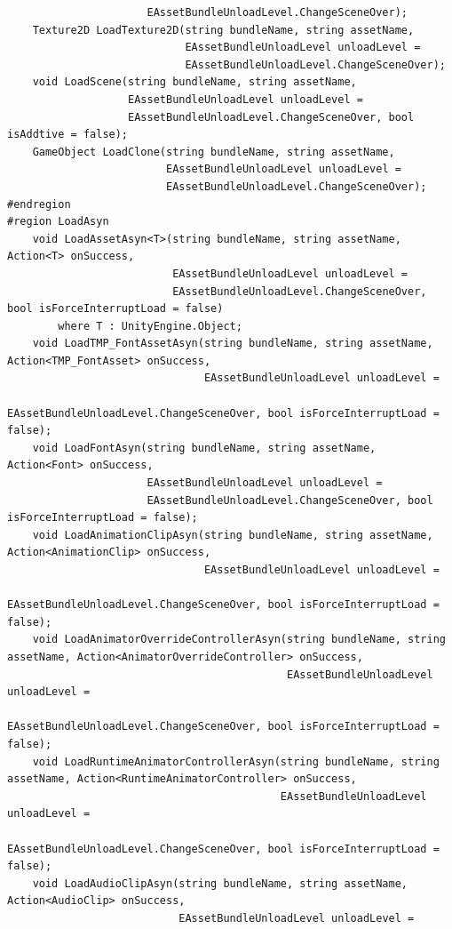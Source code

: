 \documentclass[9pt, b5paper]{article}
\begin{document}
\begin{verbatim}
                      EAssetBundleUnloadLevel.ChangeSceneOver);
    Texture2D LoadTexture2D(string bundleName, string assetName, 
                            EAssetBundleUnloadLevel unloadLevel = 
                            EAssetBundleUnloadLevel.ChangeSceneOver);
    void LoadScene(string bundleName, string assetName, 
                   EAssetBundleUnloadLevel unloadLevel = 
                   EAssetBundleUnloadLevel.ChangeSceneOver, bool isAddtive = false);
    GameObject LoadClone(string bundleName, string assetName, 
                         EAssetBundleUnloadLevel unloadLevel = 
                         EAssetBundleUnloadLevel.ChangeSceneOver);
#endregion
#region LoadAsyn
    void LoadAssetAsyn<T>(string bundleName, string assetName, Action<T> onSuccess, 
                          EAssetBundleUnloadLevel unloadLevel = 
                          EAssetBundleUnloadLevel.ChangeSceneOver, bool isForceInterruptLoad = false) 
        where T : UnityEngine.Object;
    void LoadTMP_FontAssetAsyn(string bundleName, string assetName, Action<TMP_FontAsset> onSuccess, 
                               EAssetBundleUnloadLevel unloadLevel = 
                               EAssetBundleUnloadLevel.ChangeSceneOver, bool isForceInterruptLoad = false);
    void LoadFontAsyn(string bundleName, string assetName, Action<Font> onSuccess, 
                      EAssetBundleUnloadLevel unloadLevel = 
                      EAssetBundleUnloadLevel.ChangeSceneOver, bool isForceInterruptLoad = false);
    void LoadAnimationClipAsyn(string bundleName, string assetName, Action<AnimationClip> onSuccess, 
                               EAssetBundleUnloadLevel unloadLevel = 
                               EAssetBundleUnloadLevel.ChangeSceneOver, bool isForceInterruptLoad = false);
    void LoadAnimatorOverrideControllerAsyn(string bundleName, string assetName, Action<AnimatorOverrideController> onSuccess, 
                                            EAssetBundleUnloadLevel unloadLevel = 
                                            EAssetBundleUnloadLevel.ChangeSceneOver, bool isForceInterruptLoad = false);
    void LoadRuntimeAnimatorControllerAsyn(string bundleName, string assetName, Action<RuntimeAnimatorController> onSuccess, 
                                           EAssetBundleUnloadLevel unloadLevel = 
                                           EAssetBundleUnloadLevel.ChangeSceneOver, bool isForceInterruptLoad = false);
    void LoadAudioClipAsyn(string bundleName, string assetName, Action<AudioClip> onSuccess, 
                           EAssetBundleUnloadLevel unloadLevel = 

\end{verbatim}
\end{document}
